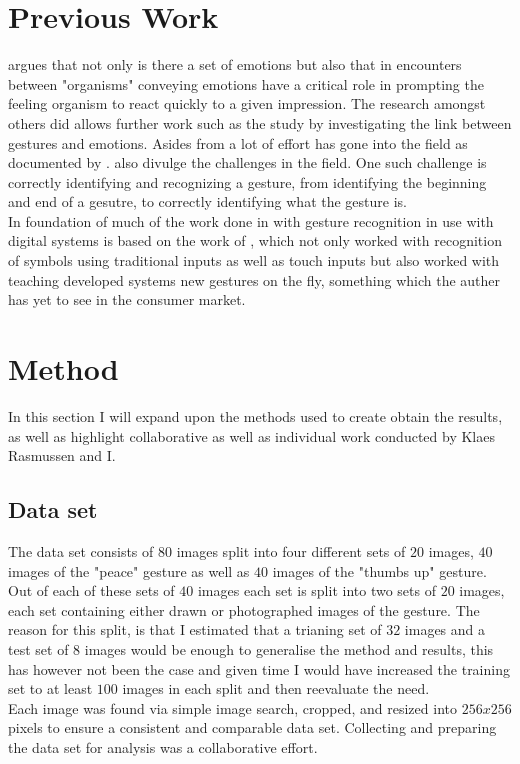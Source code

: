 \documentclass[11pt, a4paper]{article}
\begin{document}
\section{Previous Work}
 argues that not only is there a set of emotions but also that in encounters between "organisms" conveying emotions have a critical role in prompting the feeling organism to react quickly to a given impression. The research  amongst others did allows further work such as the study by  investigating the link between gestures and emotions. Asides from  a lot of effort has gone into the field as documented by .  also divulge the challenges in the field. One such challenge is correctly identifying and recognizing a gesture, from identifying the beginning and end of a gesutre, to correctly identifying what the gesture is.\\

In foundation of much of the work done in with gesture recognition in use with digital systems is based on the work of , which not only worked with recognition of symbols using traditional inputs as well as touch inputs but also worked with teaching developed systems new gestures on the fly, something which the auther has yet to see in the consumer market.
\section{Method}
In this section I will expand upon the methods used to create obtain the results, as well as highlight collaborative as well as individual work conducted by Klaes Rasmussen and I.\\
\subsection{Data set}
The data set consists of \(80\) images split into four different sets of \(20\) images, \(40\) images of the "peace" gesture as well as \(40\) images of the "thumbs up" gesture. Out of each of these sets of \(40\) images each set is split into two sets of \(20\) images, each set containing either drawn or photographed images of the gesture. The reason for this split, is that I estimated that a trianing set of \(32\) images and a test set of \(8\) images would be enough to generalise the method and results, this has however not been the case and given time I would have increased the training set to at least \(100\) images in each split and then reevaluate the need.\\
Each image was found via simple image search, cropped, and resized into \(256x256\) pixels to ensure a consistent and comparable data set. Collecting and preparing the data set for analysis was a collaborative effort.\\
\end{document}

